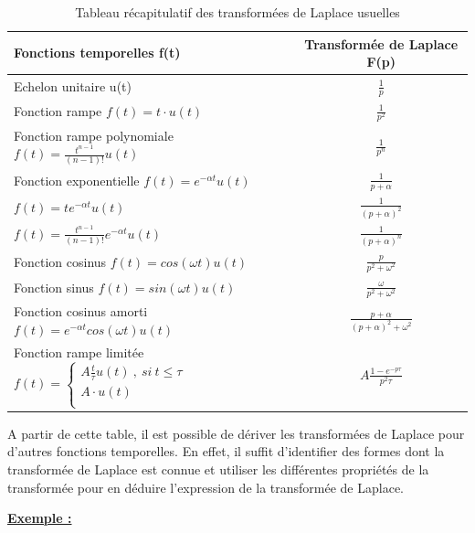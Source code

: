 	\begin{table}[h!]
		\centering
		\caption{\label{Tab:Transfo_Laplace_usuelle} Tableau récapitulatif des transformées de Laplace usuelles}
		\begin{tabular}{|l|c|}
			\hline
			\textbf{Fonctions temporelles f(t)} & \textbf{Transformée de Laplace F(p)} \\
			\hline
			Echelon unitaire u(t) & $\frac{1}{p}$ \\	
			\hline
			Fonction rampe $f(t)=t\cdot u(t)$ & $\frac{1}{p^{2}}$ \\	
			\hline
			Fonction rampe polynomiale $f(t)=\frac{t^{n-1}}{(n-1)!} u(t)$ & $\frac{1}{p^{n}}$ \\	
			\hline
			Fonction exponentielle $f(t)=e^{-\alpha t} u(t)$ & $\frac{1}{p+\alpha}$ \\	
			\hline
			$f(t)=te^{-\alpha t} u(t)$ & $\frac{1}{(p+\alpha)^{2}}$ \\
			\hline
			$f(t)=\frac{t^{n-1}}{(n-1)!}e^{-\alpha t} u(t)$ & $\frac{1}{(p+\alpha)^{n}}$ \\
			\hline
			Fonction cosinus $f(t)=cos(\omega t)u(t)$ & $\frac{p}{p^{2}+\omega^{2}}$ \\
			\hline
			Fonction sinus $f(t)=sin(\omega t)u(t)$ & $\frac{\omega}{p^{2}+\omega^{2}}$ \\
			\hline
			Fonction cosinus amorti $f(t)=e^{-\alpha t}cos(\omega t)u(t)$ &  $\frac{p+\alpha}{(p+\alpha)^{2}+\omega^{2}}$ \\
			\hline
			Fonction rampe limitée $f(t)= \left\{\begin{array}{l}
			A\frac{t}{\tau}u(t)~,~si~t \leq \tau \\
			A\cdot u(t) \\
			\end{array} 
			\right . $ & $A\frac{1-e^{-p\tau}}{p^{2}\tau}$ \\
			\hline
		\end{tabular}	
	\end{table}


	A partir de cette table, il est possible de dériver les transformées de Laplace pour d'autres fonctions temporelles. En effet, il suffit d'identifier des formes dont la transformée de Laplace est connue et utiliser les différentes propriétés de la transformée pour en déduire l'expression de la transformée de Laplace.
	
	\vspace{1\baselineskip}
	
	\textbf{\underline{Exemple : }}
	
